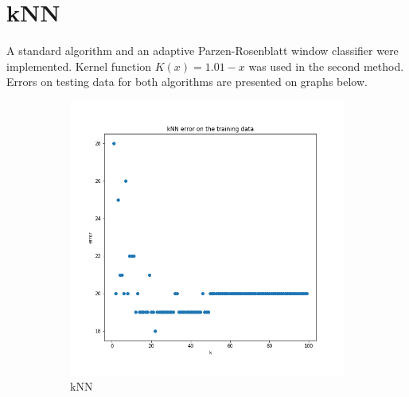 \documentclass{article}
\begin{document}
\section{kNN}

A standard algorithm and an adaptive Parzen-Rosenblatt window classifier were implemented. Kernel function $K(x) = 1.01 - x $ was used in the second method. Errors on testing data for both algorithms are presented on graphs below.

\begin{figure}[t]
    \centering
    \begin{subfigure}[b]{0.5\textwidth}
        \centering
        \includegraphics[width=\linewidth]{kNN-bin}
        \caption{kNN}
    \end{subfigure}%
    ~ 
    \begin{subfigure}[b]{0.5\textwidth}
        \centering

\end{subfigure}
\end{figure}
\end{document}
